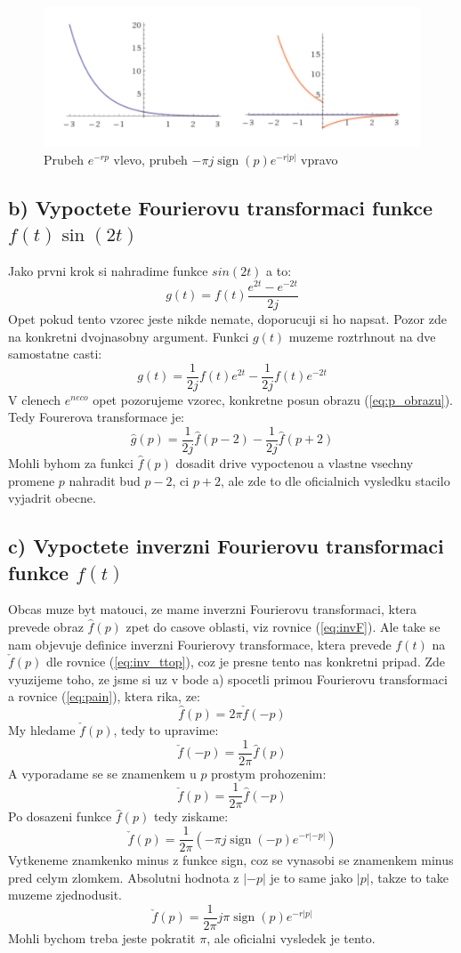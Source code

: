 \begin{figure}
\includegraphics[width=\columnwidth]{fig/exp.pdf}
\caption{\label{fig:exp}Prubeh $e^{-rp}$ vlevo, prubeh $-\pi j \operatorname{sign}(p) e^{-r|p|}$ vpravo}
\end{figure}

\newpage

\subsection{b) Vypoctete Fourierovu transformaci funkce $f(t)\operatorname{sin}(2t)$}

Jako prvni krok si nahradime funkce $sin(2t)$ a to:
$$g(t)=f(t)\frac{e^{2t}-e^{-2t}}{2j}$$
Opet pokud tento vzorec jeste nikde nemate, doporucuji si ho napsat. Pozor zde na konkretni dvojnasobny argument. Funkci $g(t)$ muzeme roztrhnout na dve samostatne casti:
$$g(t) = \frac{1}{2j}f(t)e^{2t}-\frac{1}{2j}f(t)e^{-2t}$$
V clenech $e^{neco}$ opet pozorujeme vzorec, konkretne posun obrazu (\ref{eq:p_obrazu}). Tedy Fourerova transformace je:
$$\hat{g}(p)=\frac{1}{2j}\hat{f}(p-2)-\frac{1}{2j}\hat{f}(p+2)$$
Mohli byhom za funkci $\hat{f}(p)$ dosadit drive vypoctenou a vlastne vsechny promene $p$ nahradit bud $p-2$, ci $p+2$, ale zde to dle oficialnich vysledku stacilo vyjadrit obecne.

\newpage

\subsection{c) Vypoctete inverzni Fourierovu transformaci funkce $f(t)$}

Obcas muze byt matouci, ze mame inverzni Fourierovu transformaci, ktera prevede obraz $\hat{f}(p)$ zpet do casove oblasti, viz rovnice (\ref{eq:invF}). Ale take se nam objevuje definice inverzni Fourierovy transformace, ktera prevede $f(t)$ na $\check{f}(p)$ dle rovnice (\ref{eq:inv_ttop}), coz je presne tento nas konkretni pripad. Zde vyuzijeme toho, ze jsme si uz v bode a) spocetli primou Fourierovu transformaci a rovnice (\ref{eq:pain}), ktera rika, ze:
$$\hat{f}(p) = 2\pi \check{f}(-p)$$
My hledame $\check{f}(p)$, tedy to upravime:
$$\check{f}(-p) = \frac{1}{2\pi}\hat{f}(p)$$
A vyporadame se se znamenkem u $p$ prostym prohozenim:
$$\check{f}(p) = \frac{1}{2\pi}\hat{f}(-p)$$
Po dosazeni funkce $\hat{f}(p)$ tedy ziskame:
$$\check{f}(p) = \frac{1}{2\pi} \left(-\pi j \operatorname{sign}(-p) e^{-r|-p|} \right)$$
Vytkeneme znamkenko minus z funkce sign, coz se vynasobi se znamenkem minus pred celym zlomkem. Absolutni hodnota z $|-p|$ je to same jako $|p|$, takze to take muzeme zjednodusit.
$$\check{f}(p)=\frac{1}{2\pi} j \pi \operatorname{sign}(p) e^{-r|p|}$$
Mohli bychom treba jeste pokratit $\pi$, ale oficialni vysledek je tento. 

